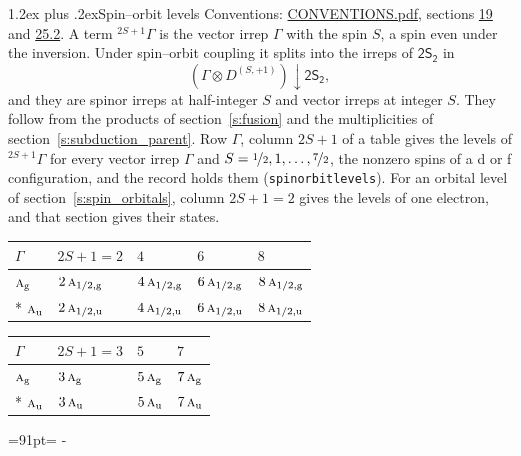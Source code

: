 \documentclass[10pt,a4paper]{article}
\makeatletter
\renewcommand\section{\@startsection{section}{1}{\z@}{-3ex plus -1ex minus -.2ex}%
  {1.2ex plus .2ex}{\normalfont\large\sffamily\bfseries\color{parttitle}}}
\newcommand{\needspace}[1]{\par\penalty-100\begingroup\dimen0=#1\relax\dimen2=\pagegoal
  \advance\dimen2-\pagetotal\ifdim\dimen0>\dimen2\relax\ifdim\dimen2>0pt\vfil\break\fi\fi
  \endgroup}
\numberwithin{equation}{section}
\newcommand{\grp}[1]{\mathsf{#1}}
\newcommand{\irr}[1]{\text{\normalfont\scshape #1}}
\newcommand{\ptag}[1]{\mathrm{#1}}
\newcommand{\restr}[2]{#1\!\downarrow#2}
\newcommand{\irrJp}[2]{D^{(#1,#2)}}
\newcommand{\irrprod}{\otimes}
\newcommand{\term}[2]{{}^{#1}#2}
\makeatother
\begin{document}
\section{Spin--orbit levels}\label{s:spin_orbit}
Conventions: \href{../../CONVENTIONS.pdf}{CONVENTIONS.pdf}, sections \href{../../../rotation/CONVENTIONS.pdf\#conv.19}{19} and \href{../../CONVENTIONS.pdf\#conv.25.2}{25.2}.
\leavevmode\label{n:local.spin}\label{n:symbol.term}A term $\term{2S+1}{\Gamma}$ is the vector irrep $\Gamma$ with the spin $S$, a spin even under the inversion. Under spin--orbit coupling it splits into the irreps of $\grp{2S_{2}}$ in
\begin{equation}\label{e:spinorbit}\restr{(\Gamma \irrprod \irrJp{S}{+1})}{\grp{2S_{2}}},\end{equation}
and they are spinor irreps at half-integer $S$ and vector irreps at integer $S$. They follow from the products of section~\ref{s:fusion} and the multiplicities of section~\ref{s:subduction_parent}. Row $\Gamma$, column $2S + 1$ of a table gives the levels of $\term{2S+1}{\Gamma}$ for every vector irrep $\Gamma$ and $S = \nicefrac{1}{2}, 1, \dots, \nicefrac{7}{2}$, the nonzero spins of a d or f configuration, and the record holds them (\texttt{spinorbitlevels}). For an orbital level of section~\ref{s:spin_orbitals}, column $2S + 1 = 2$ gives the levels of one electron, and that section gives their states.
{\small\setlength{\tabcolsep}{3pt}\begin{longtable}{@{}lllll@{}}\toprule
$\Gamma$ & $2S + 1 = 2$ & $4$ & $6$ & $8$\\\midrule\endhead
\bottomrule\endfoot\endlastfoot
$\irr{a}_{\ptag{g}}$ & $2\,\irr{a}_{1/2,\ptag{g}}$ & $4\,\irr{a}_{1/2,\ptag{g}}$ & $6\,\irr{a}_{1/2,\ptag{g}}$ & $8\,\irr{a}_{1/2,\ptag{g}}$\\*
$\irr{a}_{\ptag{u}}$ & $2\,\irr{a}_{1/2,\ptag{u}}$ & $4\,\irr{a}_{1/2,\ptag{u}}$ & $6\,\irr{a}_{1/2,\ptag{u}}$ & $8\,\irr{a}_{1/2,\ptag{u}}$\\
\bottomrule\end{longtable}}
{\small\setlength{\tabcolsep}{3pt}\begin{longtable}{@{}llll@{}}\toprule
$\Gamma$ & $2S + 1 = 3$ & $5$ & $7$\\\midrule\endhead
\bottomrule\endfoot\endlastfoot
$\irr{a}_{\ptag{g}}$ & $3\,\irr{a}_{\ptag{g}}$ & $5\,\irr{a}_{\ptag{g}}$ & $7\,\irr{a}_{\ptag{g}}$\\*
$\irr{a}_{\ptag{u}}$ & $3\,\irr{a}_{\ptag{u}}$ & $5\,\irr{a}_{\ptag{u}}$ & $7\,\irr{a}_{\ptag{u}}$\\
\bottomrule\end{longtable}}
\needspace{91pt}
\end{document}
